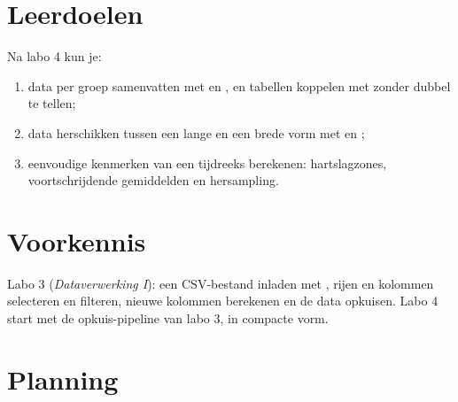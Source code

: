 \documentclass[11pt,a4paper]{article}
\begin{document}



\section{Leerdoelen}

Na labo 4 kun je:

\begin{enumerate}[label=\textbf{LD\arabic*}, leftmargin=1.4cm]
  \item data per groep samenvatten met  en , en
        tabellen koppelen met  zonder dubbel te tellen;
  \item data herschikken tussen een lange en een brede vorm met
         en ;
  \item eenvoudige kenmerken van een tijdreeks berekenen: hartslagzones,
        voortschrijdende gemiddelden en hersampling.
\end{enumerate}

\section{Voorkennis}

Labo 3 (\emph{Dataverwerking I}): een CSV-bestand inladen met
, rijen en kolommen selecteren en filteren, nieuwe kolommen
berekenen en de data opkuisen. Labo 4 start met de opkuis-pipeline van
labo 3, in compacte vorm.





\section{Planning}



\end{document}
